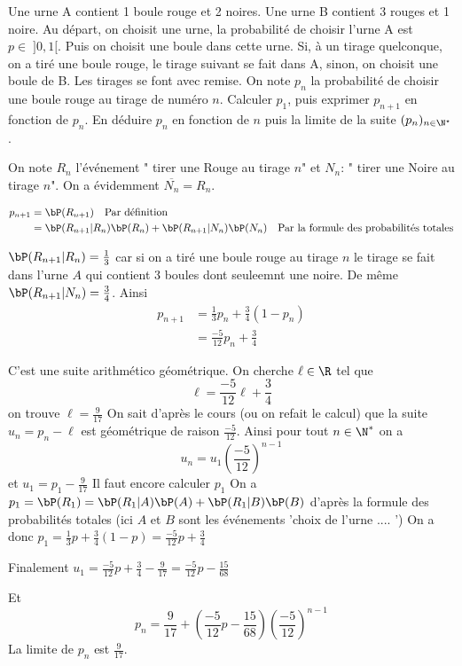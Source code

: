 


\begin{exercice}   \;
Une urne A contient 1 boule rouge et 2 noires. Une urne B contient 3 rouges et 1 noire. Au d\'epart, on choisit une urne, la probabilit\'e de choisir l'urne A est $p\in \; \rbrack 0,1\lbrack$. Puis on choisit une boule dans cette urne. Si, \`a un tirage quelconque, on a tir\'e une boule rouge, le tirage suivant se fait dans A, sinon, on choisit une boule de B. Les tirages se font avec remise. On note $p_n$ la probabilit\'e de choisir une boule rouge au tirage de num\'ero $n$. Calculer $p_1$, puis exprimer $p_{n+1}$ en fonction de $p_n$. En d\'eduire $p_n$ en fonction de $n$ puis la limite de la suite $(p_n)_{n\in\N^{\star}}$.
\end{exercice}
\begin{correction}
On note $R_n$ l'événement " tirer une Rouge au tirage $n$" et $N_n$: " tirer une Noire au tirage $n$". On a évidemment $\overline{N_n} =R_n$. 

\begin{align*}
p_{n+1} &= \bP(R_{n+1} ) \quad \text{Par définition} \\
			&= \bP(R_{n+1}  | R_n ) \bP(R_n) +   \bP(R_{n+1}  | N_n ) \bP(N_n)  \quad \text{Par la formule des probabilités totales} 
\end{align*}

$\bP(R_{n+1}  | R_n ) =\frac{1}{3}$  car si on a tiré une boule rouge au tirage $n$ le tirage se fait dans l'urne $A$ qui contient 3 boules dont seuleemnt une noire. De même $\bP(R_{n+1}  | N_n ) =\frac{3}{4}$.
Ainsi
\begin{align*}
p_{n+1} &= \frac{1}{3}p_n + \frac{3}{4}(1-p_n)\\
			&= \frac{-5}{12} p_n + \frac{3}{4}
\end{align*}

C'est une suite arithmético géométrique. On cherche $\ell\in \R$ tel que 
$$\ell =  \frac{-5}{12} \ell+ \frac{3}{4}$$
on trouve $\ell = \frac{9}{17}$
On sait d'après le cours (ou  on refait le calcul) que la suite $u_n=p_n - \ell  $ est géométrique de raison $\frac{-5}{12}$. 
Ainsi pour tout $n\in \N^*$ on a 
$$u_n = u_1 \left(\frac{-5}{12} \right)^{n-1}$$
et $u_1 = p_1- \frac{9}{17} $
Il faut encore calculer $p_1$ 
On a $p_1= \bP(R_1) = \bP(R_1|A) \bP(A) +  \bP(R_1|B) \bP(B)$ d'après la formule des probabilités totales (ici $A$ et $B$ sont les événements 'choix de l'urne .... ') 
On a donc $p_1 = \frac{1}{3}p +\frac{3}{4}(1-p)= \frac{-5}{12} p + \frac{3}{4}$

Finalement $u_1= \frac{-5}{12} p + \frac{3}{4} - \frac{9}{17}=  \frac{-5}{12} p-\frac{15}{68}$

Et $$p_n = \frac{9}{17}  + \left(\frac{-5}{12} p-\frac{15}{68}\right) \left(\frac{-5}{12} \right)^{n-1}$$
La limite de $p_n$ est $\frac{9}{17}$.

\end{correction}